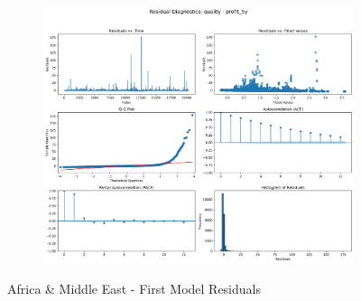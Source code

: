 \documentclass[11pt,english,a4paper,hidelinks]{book}
\begin{document}
\begin{figure}[H]
\begin{subfigure}[b]{0.32\textwidth}
    \end{subfigure}
    \hfill
    \begin{subfigure}[b]{0.32\textwidth}
        \centering
        \includegraphics[width=\textwidth]{images/code/models/linear_regression/first_model/AF/quality_profit_5y_residuals.png}
    \end{subfigure}
    \caption{Africa \& Middle East - First Model Residuals}
    \label{fig:linear_regression_AF_residues}
\end{figure}
\end{document}
